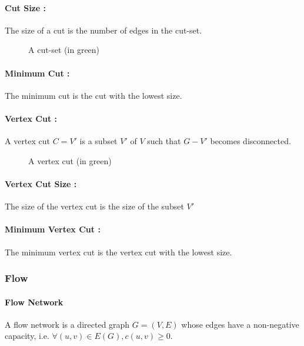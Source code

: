 \paragraph{Cut Size :}
The size of a cut is the number of edges in the cut-set.

\begin{figure}[!h]
  \begin{center}
    
  \end{center}
  \caption{A cut-set (in green)}
\end{figure}

\paragraph{Minimum Cut :} 
The minimum cut is the cut with the lowest size. 

\paragraph{Vertex Cut :}
A vertex cut $C=V'$ is a subset $V'$ of $V$ such that $G-V'$ becomes
disconnected.

\begin{figure}[!h]
  \begin{center}
    
  \end{center}
  \caption{A vertex cut (in green)}
\end{figure}


\paragraph{Vertex Cut Size :}
The size of the  vertex cut is the size of the subset $V'$

\paragraph{Minimum Vertex Cut :}
The minimum vertex cut is the vertex cut with the lowest size.

\subsubsection{Flow}
\paragraph{Flow Network}
A flow network is a directed graph $G=(V,E)$ whose edges have a non-negative
capacity, i.e. $\forall (u,v) \in E(G), c(u,v) \geq 0$.

